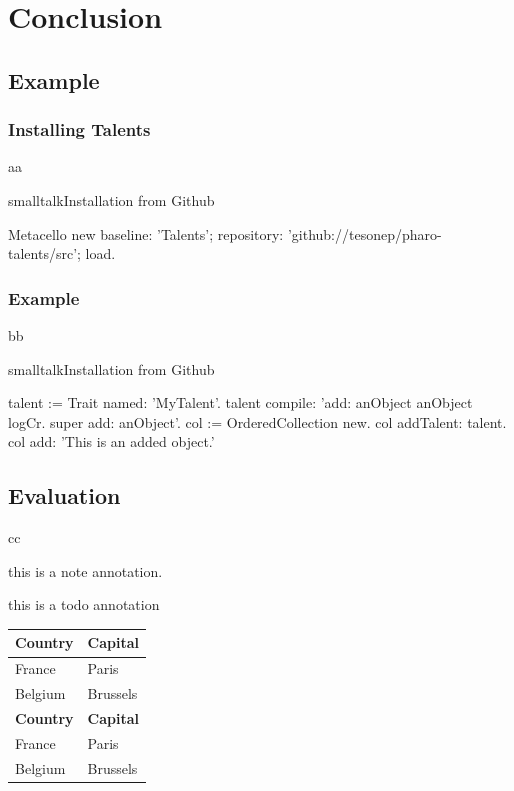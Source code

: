 \documentclass[10pt,twoside,english]{_support/latex/sbabook/sbabook}
\begin{document}
\chapter{Conclusion}\section{Example}\subsection{Installing Talents}
aa

\begin{listing}[float, label=install]{smalltalk}{Installation from Github}

Metacello new
  baseline: 'Talents';
  repository: 'github://tesonep/pharo-talents/src';
  load.
\end{listing}
\subsection{Example}
bb

\begin{listing}[float, label=talent-example]{smalltalk}{Installation from Github}

talent := Trait named: 'MyTalent'.
talent compile: 'add: anObject
anObject logCr.
super add: anObject'.
col := OrderedCollection new.
col addTalent: talent.
col add: 'This is an added object.'
\end{listing}
\section{Evaluation}
cc

\begin{note}
this is a note annotation.
\end{note}

\begin{todo}
this is a todo annotation
\end{todo}

\begin{tabular}{ll}
\toprule
\textbf{Country} & \textbf{Capital} \\
\midrule
France & Paris \\
Belgium & Brussels \\
\textbf{Country} & \textbf{Capital} \\
\midrule
France & Paris \\
Belgium & Brussels \\
\bottomrule
\end{tabular}






\backmatter

\end{document}
